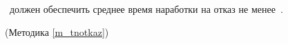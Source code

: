 \dut \ должен обеспечить среднее время наработки на отказ не менее~\tnotkaz.

\begin{flushright}
	(Методика \ref{m_tnotkaz})
\end{flushright}